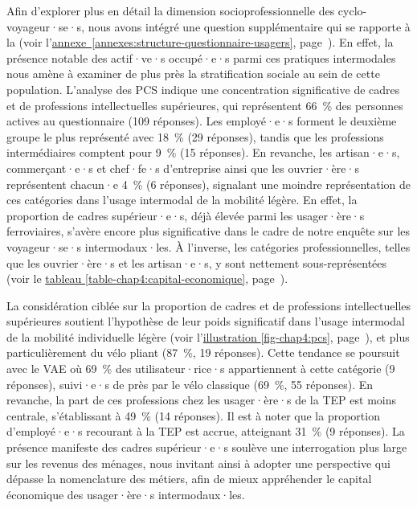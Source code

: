 \begin{refsegment}
Afin d'explorer plus en détail la dimension socioprofessionnelle des cyclo-voyageur·se·s, nous avons intégré une question supplémentaire qui se rapporte à la  (voir l'\hyperref[annexes:structure-questionnaire-usagers]{annexe~\ref{annexes:structure-questionnaire-usagers}}, page~\pageref{annexes:structure-questionnaire-usagers}). En effet, la présence notable des actif·ve·s occupé·e·s parmi ces pratiques intermodales nous amène à examiner de plus près la stratification sociale au sein de cette population. L'analyse des \acrshort{PCS} indique une concentration significative de cadres et de professions intellectuelles supérieures, qui représentent 66~\% des personnes actives au questionnaire (109 réponses). Les employé·e·s forment le deuxième groupe le plus représenté avec 18~\% (29 réponses), tandis que les professions intermédiaires comptent pour 9~\% (15 réponses). En revanche, les artisan·e·s, commerçant·e·s et chef·fe·s d'entreprise ainsi que les ouvrier·ère·s représentent chacun·e 4~\% (6 réponses), signalant une moindre représentation de ces catégories dans l'usage intermodal de la mobilité légère. En effet, la proportion de cadres supérieur·e·s, déjà élevée parmi les usager·ère·s ferroviaires, s'avère encore plus significative dans le cadre de notre enquête sur les voyageur·se·s intermodaux·les. À l'inverse, les catégories professionnelles, telles que les ouvrier·ère·s et les artisan·e·s, y sont nettement sous-représentées (voir le \hyperref[table-chap4:capital-economique]{tableau \ref{table-chap4:capital-economique}}, page~\pageref{table-chap4:capital-economique}).%

La considération ciblée sur la proportion de cadres et de professions intellectuelles supérieures soutient l'hypothèse de leur poids significatif dans l'usage intermodal de la mobilité individuelle légère (voir l'\hyperref[fig-chap4:pcs]{illustration \ref{fig-chap4:pcs}}, page~\pageref{fig-chap4:pcs}), et plus particulièrement du vélo pliant (87~\%, 19 réponses). Cette tendance se poursuit avec le \acrshort{VAE} où 69~\% des utilisateur·rice·s appartiennent à cette catégorie (9 réponses), suivi·e·s de près par le vélo classique (69~\%, 55 réponses). En revanche, la part de ces professions chez les usager·ère·s de la \acrshort{TEP} est moins centrale, s'établissant à 49~\% (14 réponses). Il est à noter que la proportion d'employé·e·s recourant à la \acrshort{TEP} est accrue, atteignant 31~\% (9 réponses). La présence manifeste des cadres supérieur·e·s soulève une interrogation plus large sur les revenus des ménages, nous invitant ainsi à adopter une perspective qui dépasse la nomenclature des métiers, afin de mieux appréhender le capital économique des usager·ère·s intermodaux·les.%


\end{refsegment}
